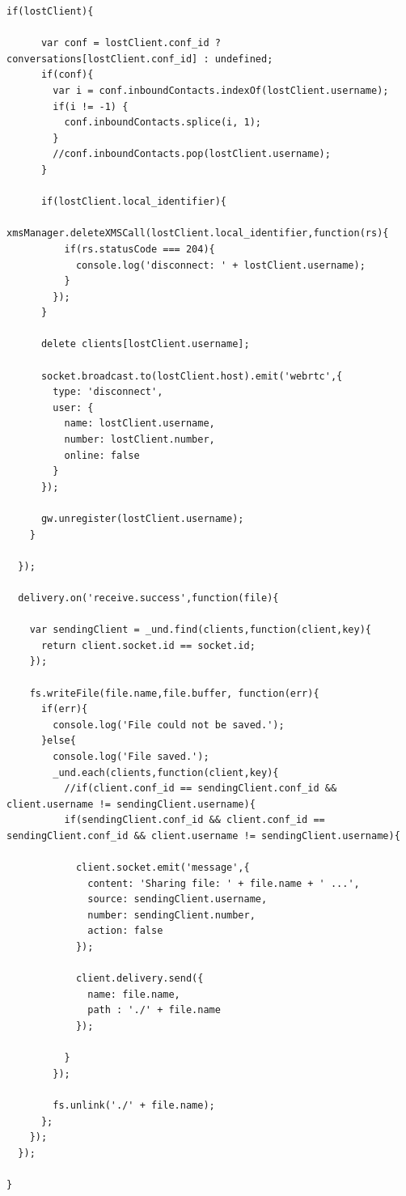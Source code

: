 \begin{appendices}
\begin{lstlisting}[caption={socket.js on Application Server},label={code:server_socket}]
    if(lostClient){

      var conf = lostClient.conf_id ? conversations[lostClient.conf_id] : undefined;
      if(conf){
        var i = conf.inboundContacts.indexOf(lostClient.username);
        if(i != -1) {
          conf.inboundContacts.splice(i, 1);
        }
        //conf.inboundContacts.pop(lostClient.username);
      }

      if(lostClient.local_identifier){
        xmsManager.deleteXMSCall(lostClient.local_identifier,function(rs){
          if(rs.statusCode === 204){
            console.log('disconnect: ' + lostClient.username);
          }
        });
      }

      delete clients[lostClient.username];

      socket.broadcast.to(lostClient.host).emit('webrtc',{
        type: 'disconnect',
        user: {
          name: lostClient.username,
          number: lostClient.number,
          online: false
        }
      });

      gw.unregister(lostClient.username);
    }

  });

  delivery.on('receive.success',function(file){

    var sendingClient = _und.find(clients,function(client,key){
      return client.socket.id == socket.id;
    });

    fs.writeFile(file.name,file.buffer, function(err){
      if(err){
        console.log('File could not be saved.');
      }else{
        console.log('File saved.');
        _und.each(clients,function(client,key){
          //if(client.conf_id == sendingClient.conf_id && client.username != sendingClient.username){
          if(sendingClient.conf_id && client.conf_id == sendingClient.conf_id && client.username != sendingClient.username){

            client.socket.emit('message',{
              content: 'Sharing file: ' + file.name + ' ...',
              source: sendingClient.username,
              number: sendingClient.number,
              action: false
            });

            client.delivery.send({
              name: file.name,
              path : './' + file.name
            });

          }
        });

        fs.unlink('./' + file.name);
      };
    });
  });

}
\end{lstlisting}


\end{appendices}
